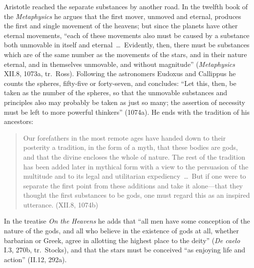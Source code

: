 Aristotle reached the separate substances by another road. In the
twelfth book of the \emph{Metaphysics} he argues that the first mover,
unmoved and eternal, produces the first and single movement of the
heavens; but since the planets have other eternal movements, ``each of
these movements also must be caused by a substance both unmovable in
itself and eternal~\dots\ Evidently, then, there must be substances
which are of the same number as the movements of the stars, and in their
nature eternal, and in themselves unmovable, and without magnitude''
(\emph{Metaphysics} XII.8, 1073a, tr.\ Ross). Following the astronomers
Eudoxus and Callippus he counts the spheres, fifty-five or forty-seven,
and concludes: ``Let this, then, be taken as the number of the spheres,
so that the unmovable substances and principles also may probably be
taken as just so many; the assertion of necessity must be left to more
powerful thinkers'' (1074a). He ends with the tradition of his
ancestors:
\begin{quote}
Our forefathers in the most remote ages have handed down to their
posterity a tradition, in the form of a myth, that these bodies are
gods, and that the divine encloses the whole of nature. The rest of the
tradition has been added later in mythical form with a view to the
persuasion of the multitude and to its legal and utilitarian
expediency~\dots\ But if one were to separate the first point from these
additions and take it alone---that they thought the first substances to
be gods, one must regard this as an inspired utterance. (XII.8, 1074b)
\end{quote}
In the treatise \emph{On the Heavens} he adds that ``all men have some
conception of the nature of the gods, and all who believe in the
existence of gods at all, whether barbarian or Greek, agree in allotting
the highest place to the deity'' (\emph{De caelo} I.3, 270b, tr.\
Stocks), and that the stars must be conceived ``as enjoying life and
action'' (II.12, 292a).

